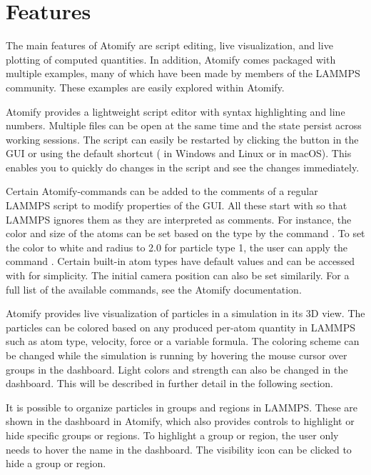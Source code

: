 \documentclass[aps,pre,twocolumn,letterpaper,floatfix,nofootinbib]{revtex4}
\begin{document}
\section{Features}

The main features of Atomify are script editing,
live visualization, and live plotting of computed quantities.
In addition, Atomify comes packaged with multiple examples,
many of which have been made by members of the LAMMPS community.
These examples are easily explored within Atomify.

Atomify provides a lightweight script editor with syntax highlighting and line
numbers.
Multiple files can be open at the same time and the state persist across working sessions.
The script can easily be restarted by clicking the button in the GUI or using
the default shortcut ( in Windows and Linux or  in macOS).
This enables you to quickly do changes in the script and see the changes immediately. 

Certain Atomify-commands can be added to the comments of a regular LAMMPS script
to modify properties of the GUI.
All these start with \keys{\texttt{\#}} so that LAMMPS ignores them as they are
interpreted as comments.
For instance, the color and size of the atoms can be set based on the type by
the command .
To set the color to white and radius to 2.0 for particle type 1,
the user can apply the command .
Certain built-in atom types have default values and can be accessed with
 for simplicity.
The initial camera position can also be set similarily.
For a full list of the available commands, see the Atomify
documentation\citep{atomifydocumentation}.

Atomify provides live visualization of particles in a simulation in its 3D view. 
The particles can be colored based on any produced per-atom quantity in LAMMPS such as
atom type, velocity, force or a variable formula.
The coloring scheme can be changed while the simulation is running by hovering
the mouse cursor over groups in the dashboard.
Light colors and strength can also be changed in the dashboard.
This will be described in further detail in the following section.

It is possible to organize particles in groups and regions in LAMMPS.
These are shown in the dashboard in Atomify, which also provides controls to
highlight or hide specific groups or regions.
To highlight a group or region, the user only needs to hover the name in the
dashboard.
The visibility icon can be clicked to hide a group or region.
\end{document}
